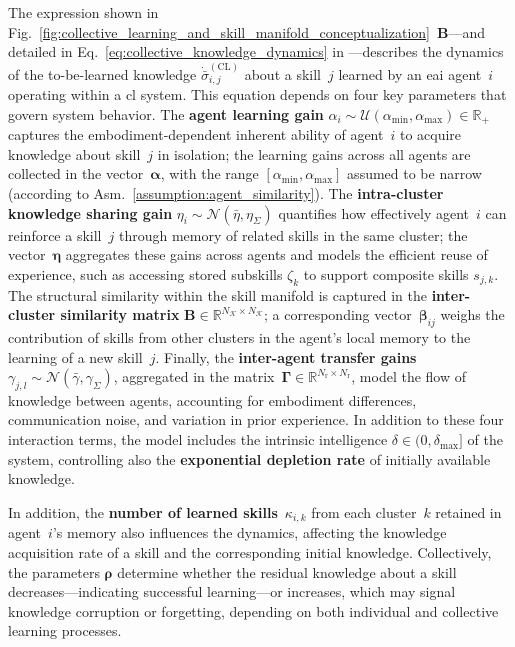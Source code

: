 \documentclass[12pt]{article}
\begin{document}
The expression shown in Fig.~\ref{fig:collective_learning_and_skill_manifold_conceptualization}~\textbf{B}---and detailed in Eq.~\eqref{eq:collective_knowledge_dynamics} in ---describes the dynamics of the to-be-learned knowledge $\dot{\bar{\sigma}}^{(\mathrm{CL})}_{i,j}$ about a skill~$j$ learned by an \ac{eai} agent~$i$ operating within a \ac{cl} system. This equation depends on four key parameters that govern system behavior. The \textbf{agent learning gain} $\alpha_i \sim \mathcal{U}(\alpha_{\text{min}},\alpha_{\text{max}}) \in \mathbb{R}_+$ captures the embodiment-dependent inherent ability of agent~$i$ to acquire knowledge about skill~$j$ in isolation; the learning gains across all agents are collected in the vector~$\bm{\alpha}$, with the range $[\alpha_{\text{min}}, \alpha_{\text{max}}]$ assumed to be narrow (according to Asm.~\ref{assumption:agent_similarity}). The \textbf{intra-cluster knowledge sharing gain} $\eta_i \sim \mathcal{N}(\bar{\eta},\eta_{\Sigma})$ quantifies how effectively agent~$i$ can reinforce a skill~$j$ through memory of related skills in the same cluster; the vector~$\bm{\eta}$ aggregates these gains across agents and models the efficient reuse of experience, such as accessing stored subskills $\zeta_k$ to support composite skills $s_{j,k}$. The structural similarity within the skill manifold is captured in the \textbf{inter-cluster similarity matrix} $\bm{B} \in \mathbb{R}^{N_\mathcal{K} \times N_\mathcal{K}}$; a corresponding vector~$\bm{\beta}_{ij}$ weighs the contribution of skills from other clusters in the agent’s local memory to the learning of a new skill~$j$. Finally, the \textbf{inter-agent transfer gains} $\gamma_{j,l} \sim \mathcal{N}(\bar{\gamma},\gamma_\Sigma)$, aggregated in the matrix~$\bm{\Gamma} \in \mathbb{R}^{N_\mathrm{r} \times N_\mathrm{r}}$, model the flow of knowledge between agents, accounting for embodiment differences, communication noise, and variation in prior experience. In addition to these four interaction terms, the model includes the intrinsic intelligence $\delta \in (0,\delta_{\text{max}}]$ of the system, controlling also the \textbf{exponential depletion rate} of initially available knowledge.

In addition, the \textbf{number of learned skills}~$\kappa_{i,k}$ from each cluster~$k$ retained in agent~$i$’s memory also influences the dynamics, affecting the knowledge acquisition rate of a skill and the corresponding initial knowledge. Collectively, the parameters $\bm{\rho}$ determine whether the residual knowledge about a skill decreases---indicating successful learning---or increases, which may signal knowledge corruption or forgetting, depending on both individual and collective learning processes.
\end{document}
